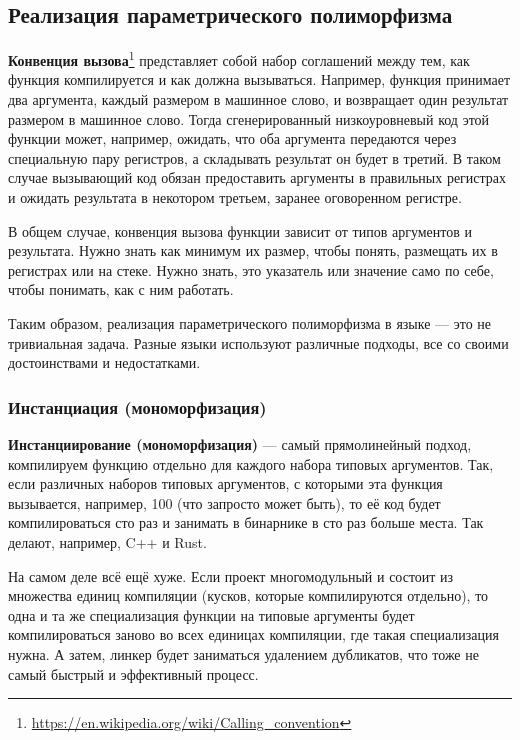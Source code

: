 \documentclass[12pt]{article}
\newcommand{\vocab}[1]{\textbf{#1}} %
\begin{document}
    \subsection{Реализация параметрического полиморфизма}

    \vocab{Конвенция вызова}\footnote{\url{https://en.wikipedia.org/wiki/Calling_convention}} представляет собой набор соглашений между тем, как функция компилируется и как должна вызываться.
    Например, функция принимает два аргумента, каждый размером в машинное слово, и возвращает один результат размером в машинное слово.
    Тогда сгенерированный низкоуровневый код этой функции может, например, ожидать, что оба аргумента передаются через специальную пару регистров, а складывать результат он будет в третий.
    В таком случае вызывающий код обязан предоставить аргументы в правильных регистрах и ожидать результата в некотором третьем, заранее оговоренном регистре.

    В общем случае, конвенция вызова функции зависит от типов аргументов и результата.
    Нужно знать как минимум их размер, чтобы понять, размещать их в регистрах или на стеке.
    Нужно знать, это указатель или значение само по себе, чтобы понимать, как с ним работать.

    Таким образом, реализация параметрического полиморфизма в языке --- это не тривиальная задача.
    Разные языки используют различные подходы, все со своими достоинствами и недостатками.

    \subsubsection{Инстанциация (мономорфизация)}

    \vocab{Инстанциирование (мономорфизация)} --- самый прямолинейный подход, компилируем функцию отдельно для каждого набора типовых аргументов.
    Так, если различных наборов типовых аргументов, с которыми эта функция вызывается, например, 100 (что запросто может быть), то её код будет компилироваться сто раз и занимать в бинарнике в сто раз больше места.
    Так делают, например, C++ и Rust.

    На самом деле всё ещё хуже.
    Если проект многомодульный и состоит из множества единиц компиляции (кусков, которые компилируются отдельно), то одна и та же специализация функции на типовые аргументы будет компилироваться заново во всех единицах компиляции, где такая специализация нужна.
    А затем, линкер будет заниматься удалением дубликатов, что тоже не самый быстрый и эффективный процесс.
\end{document}
